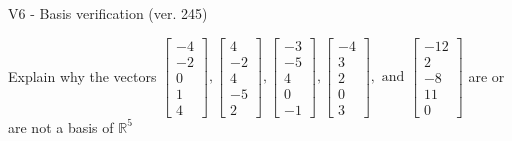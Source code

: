 \begin{exercise}
  \begin{exerciseTitle}V6 - Basis verification (ver. 245)\end{exerciseTitle}
  \begin{exerciseStatement}
    Explain why the vectors \(\left[\begin{array}{r}
-4 \\
-2 \\
0 \\
1 \\
4
\end{array}\right] , \left[\begin{array}{r}
4 \\
-2 \\
4 \\
-5 \\
2
\end{array}\right] , \left[\begin{array}{r}
-3 \\
-5 \\
4 \\
0 \\
-1
\end{array}\right] , \left[\begin{array}{r}
-4 \\
3 \\
2 \\
0 \\
3
\end{array}\right] , \text{ and } \left[\begin{array}{r}
-12 \\
2 \\
-8 \\
11 \\
0
\end{array}\right]\) are or are not a basis of \(\mathbb{R}^5\)	



\end{exerciseStatement}
\end{exercise}

